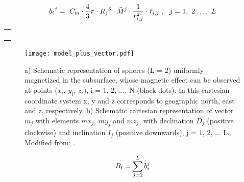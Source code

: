 
\begin{equation} \label{eq:sphere2}
\centering
{b_i}^j=\ C_m \cdot \frac{4}{3}\pi \cdot {R_j}^3 \cdot {\bar{M}}^j\cdot\frac{1}{r_{i,j}^2}\cdot{\hat{r}}_{i,j}\ ,\ \ j=1,\ 2\ldots,\ L
\end{equation}

\begin{tabular}{ l }
\noindent{Where: $C_m=\ \frac{\mu_0}{4\pi}=\ {10}^{-7}\frac{\ H}{m}$; $R_j$ is the radius of the j-th sphere; $r_{i,j}$ is the distance}   \\ 
\noindent{(unit vector ${\hat{r}}_{i,j}$) between the center of the j-th sphere and the observation point i,}    \\  
\noindent{i = 1, 2, . .. N; and ${\bar{M}}^j=\left[{Mx}_j\ {My}_j\ {Mz}_j\right]^T$ is the vector formed by the cartesian} \\
\noindent{components of the magnetization of the j-th sphere (unit vector ${\hat{M}}^j)$.}
\end{tabular}

\bigskip

\begin{figure}[htbp]
\centering
\texttt{[image: model\_plus\_vector.pdf]}
\caption{a) Schematic representation of spheres (L = 2) uniformly magnetized in the subsurface, whose magnetic effect can be observed at points ($x_i$, $ y_i$, $z_i$), i = 1, 2, ..., N (black dots). In this cartesian coordinate system x, y and z corresponds to geographic north, east and z, respectively. b) Schematic cartesian representation of vector $m_j$ with elements $mx_j$, $my_j$ and $mz_j$, with declination $D_j$ (positive clockwise) and inclination $I_j$ (positive downwards), j = 1, 2, ... L. Modified from: \cite{OliveiraJr.2015}.}
\label{fig:model_plus_vector}
\end{figure}


\begin{equation} \label{eq:sphere3}
\centering
B_i=\sum_{j=1}^{L}b_i^j
\end{equation}


